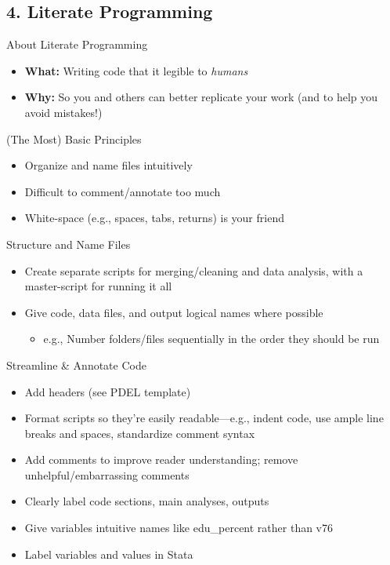 \documentclass[12pt, compress]{beamer} %
\renewcommand{\texttt}[2][ceruleanblue]{\textcolor{#1}{\ttfamily #2}}%
\let\noteitem\item %
\renewcommand{\item}{ 
	\noteitem\vspace{\fill}
	}
\begin{document}
	
\subsection{4. Literate Programming}	

	\begin{frame}{About Literate Programming}
		\begin{itemize}
			\item \textbf{What:} Writing code that it legible to \textit{humans}
			\item \textbf{Why:} So you and others can better replicate your work (and to help you avoid mistakes!)
		\end{itemize}
	\end{frame}
	
	\begin{frame}{(The Most) Basic Principles}
		\begin{itemize}
			\item Organize and name files intuitively
			\item Difficult to comment/annotate too much
			\item White-space (e.g., spaces, tabs, returns) is your friend
		\end{itemize}
	\end{frame}
	
	\begin{frame}{Structure and Name Files}
 		
 		\begin{itemize}
 			\item	 Create separate scripts for merging/cleaning and data analysis, with a master-script for running it all
 			\item Give code, data files, and output logical names where possible 
 			\begin{itemize}
 				\item e.g., Number folders/files sequentially in the order they should be run
 			\end{itemize}
 		\end{itemize}
 	\end{frame}
 
	 \begin{frame}{Streamline \& Annotate Code}
	 	
	 	\begin{itemize}
	 		\item Add headers (see PDEL template)
	 		\item Format scripts so they're easily readable---e.g., indent code, use ample line breaks and spaces, standardize comment syntax
	 		\item Add comments to improve reader understanding; remove unhelpful/embarrassing comments
			\item Clearly label code sections, main analyses, outputs 
			\item Give variables intuitive names like \texttt{edu\_percent} rather than \texttt{v76}
			\item Label variables and values in Stata
			\end{itemize}
	 \end{frame}
	 	 
\end{document}
